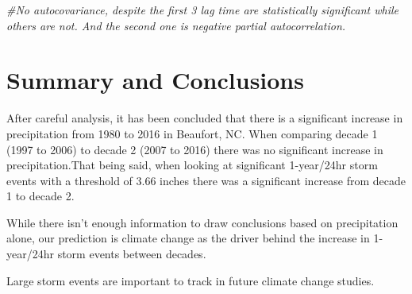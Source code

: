 \documentclass[
  12pt,
]{article}
\newenvironment{Shaded}{\begin{snugshade}}{\end{snugshade}}
\newcommand{\CommentTok}[1]{\textcolor[rgb]{0.56,0.35,0.01}{\textit{#1}}}
\begin{document}
\begin{Shaded}
\begin{Highlighting}[]
\CommentTok{\#No autocovariance, despite the first 3 lag time are statistically significant while others are not. And the second one is negative partial autocorrelation. }
\end{Highlighting}
\end{Shaded}

\newpage

\hypertarget{summary-and-conclusions}{%
\section{Summary and Conclusions}\label{summary-and-conclusions}}

After careful analysis, it has been concluded that there is a
significant increase in precipitation from 1980 to 2016 in Beaufort, NC.
When comparing decade 1 (1997 to 2006) to decade 2 (2007 to 2016) there
was no significant increase in precipitation.That being said, when
looking at significant 1-year/24hr storm events with a threshold of 3.66
inches there was a significant increase from decade 1 to decade 2.

While there isn't enough information to draw conclusions based on
precipitation alone, our prediction is climate change as the driver
behind the increase in 1-year/24hr storm events between decades.

Large storm events are important to track in future climate change
studies.
\end{document}

